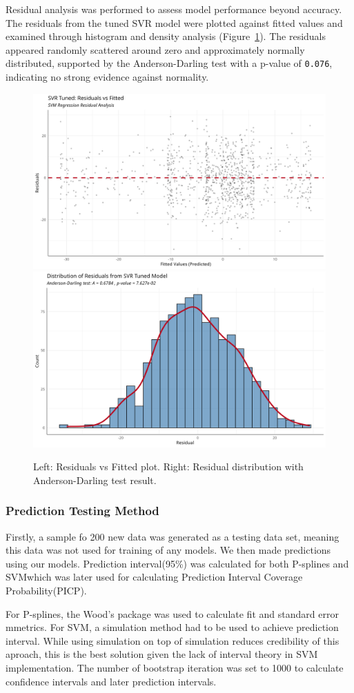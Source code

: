 \documentclass[8pt,twocolumn]{article}
\begin{document}
Residual analysis was performed to assess model performance beyond accuracy. The residuals from the tuned SVR model were plotted against fitted values and examined through histogram and density analysis (Figure~\ref{fig:svr_residuals}). The residuals appeared randomly scattered around zero and approximately normally distributed, supported by the Anderson-Darling test with a p-value of \texttt{0.076}, indicating no strong evidence against normality.

\begin{figure}[htbp]
    \centering
    \includegraphics[width=0.40\columnwidth]{img5.png}
    \includegraphics[width=0.40\columnwidth]{img6.png}
    \caption{Left: Residuals vs Fitted plot. Right: Residual distribution with Anderson-Darling test result.}
    \label{fig:svr_residuals}
\end{figure}

\subsubsection{Prediction Testing Method}

Firstly, a sample fo 200 new data was generated as a testing data set, meaning this data was not used for training of any models. We then made predictions using our models. Prediction interval(95\%) was calculated for both P-splines and SVMwhich was later used for calculating Prediction Interval Coverage Probability(PICP).

For P-splines, the Wood's package was used to calculate fit and standard error mmetrics. For SVM, a simulation method had to be used to achieve prediction interval. While using simulation on top of simulation reduces credibility of this aproach, this is the best solution given the lack of interval theory in SVM implementation. The number of bootstrap iteration was set to 1000 to calculate confidence intervals and later prediction intervals.
\end{document}
